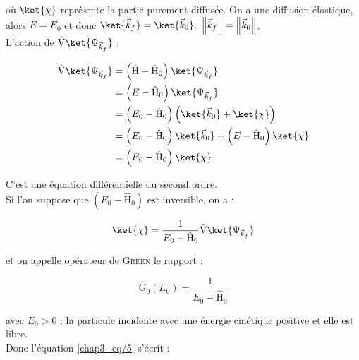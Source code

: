\documentclass[12pt,a4paper,oneside,french]{book}
\newcommand{\opr}[1]{\mathrm{\hat{#1}}}
\theoremstyle{definition}
\theoremstyle{definition}
\theoremstyle{definition}
\theoremstyle{remark}
\theoremstyle{definition}
\begin{document}
    où $\ket{\chi}$ représente la partie purement diffusée. On a une diffusion élastique, alors $E = {E}_{0}$ et donc $\ket{{\vec{k}}_{f}} = \ket{{\vec{k}}_{0}}, \ \left\lVert {\vec{k}}_{f} \right\rVert = \left\lVert {\vec{k}}_{0} \right\rVert$. \\
    
    L'action de $\opr{V} \ket{{\Psi}_{{\vec{k}}_{f}}}$ : 
    
    \begin{equation*}
    \begin{split}
        \opr{V} \ket{{\Psi}_{{\vec{k}}_{f}}} 
            &= \left(\opr{H} - {\opr{H}}_{0}\right) \ket{{\Psi}_{{\vec{k}}_{f}}} \\
            &= \left(E - {\opr{H}}_{0}\right) \ket{{\Psi}_{{\vec{k}}_{f}}} \\
            &= \left({E}_{0} - {\opr{H}}_{0}\right) \left(\ket{{\vec{k}}_{0}} + \ket{\chi \vphantom{{\vec{k}}_{0}}}\right) \\
            &= \left({E}_{0} - {\opr{H}}_{0}\right) \ket{{\vec{k}}_{0}} + \left(E - {\opr{H}}_{0}\right) \ket{\chi \vphantom{{\vec{k}}_{0}}} \\
            &= \left({E}_{0} - {\opr{H}}_{0}\right) \ket{\chi \vphantom{{\vec{k}}_{0}}}
    \end{split}
    \end{equation*}
    
    C'est une équation différentielle du second ordre. \\
    
    Si l'on suppose que $\left({E}_{0} - {\opr{H}}_{0}\right)$ est inversible, on a :
    
    \begin{equation} \label{chap3_eq/5}
        \ket{\chi \vphantom{{\Psi}_{{\vec{k}}_{f}}}} = \frac{1}{{E}_{0} - {\opr{H}}_{0}} \opr{V} \ket{{\Psi}_{{\vec{k}}_{f}}}
    \end{equation}
    
    et on appelle opérateur de \textsc{Green} le rapport :
    
    \begin{equation*}
        \opr{G}_{0}({E}_{0}) = \frac{1}{{E}_{0} - {\opr{H}}_{0}}
    \end{equation*}
    
    avec ${E}_{0} > 0$ : la particule incidente avec une énergie cinétique positive et elle est libre. \\
    
    Donc l'équation \eqref{chap3_eq/5} s'écrit :
    
\end{document}
